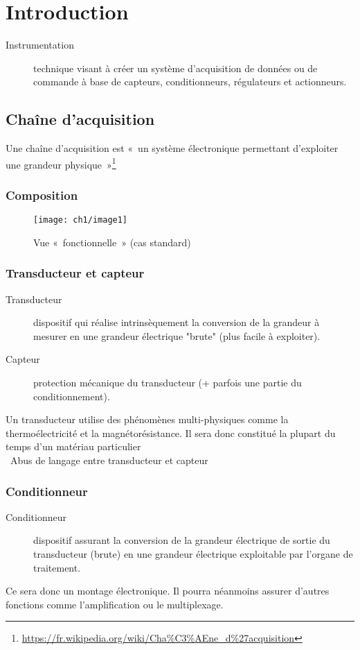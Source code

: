 \chapter{Introduction}
\begin{description}
	\item[Instrumentation] technique visant à créer un système d'acquisition de données ou de commande à base de capteurs, conditionneurs, régulateurs et actionneurs.
\end{description}
\section{Chaîne d’acquisition}
Une chaîne d'acquisition est «~un système électronique permettant d'exploiter une grandeur physique~»\footnote{\url{https://fr.wikipedia.org/wiki/Cha\%C3\%AEne_d\%27acquisition}}
\subsection{Composition}
\begin{figure}[H] 
	\centering 
	\texttt{[image: ch1/image1]}
	\caption{Vue «~fonctionnelle~» (cas standard)} 
\end{figure}
\subsection{Transducteur et capteur}
\begin{description}
	\item[Transducteur] dispositif qui réalise intrinsèquement la conversion de la grandeur à mesurer en une grandeur électrique "brute" (plus facile à exploiter).
	\item[Capteur] protection mécanique du transducteur (+ parfois une partie du conditionnement).
\end{description}
Un transducteur utilise des phénomènes multi-physiques comme la thermoélectricité et la magnétorésistance. Il sera donc constitué la plupart du temps d'un matériau particulier\\
\danger\ Abus de langage entre transducteur et capteur \danger
\subsection{Conditionneur}
\begin{description}
	\item[Conditionneur] dispositif assurant la conversion de la grandeur électrique de sortie du transducteur (brute) en une grandeur électrique exploitable par l'organe de traitement.
\end{description}
Ce sera donc un montage électronique. Il pourra néanmoins assurer d'autres fonctions comme l'amplification ou le multiplexage.
